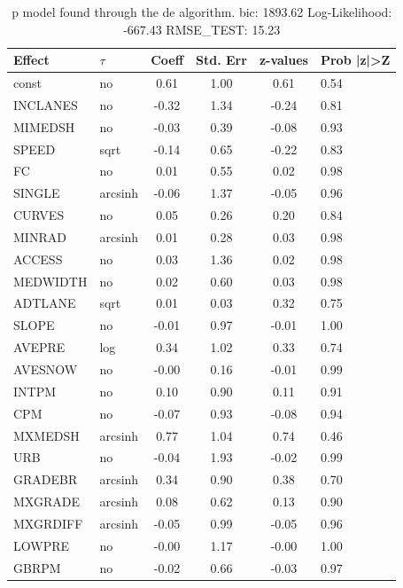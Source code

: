 \begin{table}
	\caption{p model found through the de algorithm. bic: 1893.62 Log-Likelihood: -667.43 RMSE_TEST: 15.23}
	\begin{center}
		\begin{tabular}{|l|l|c|c|c|l|}
			\hline
			Effect & $\tau$ & Coeff & Std. Err & z-values & Prob |z|>Z \\
			\hline
			const & no & 0.61 & 1.00 & 0.61 & 0.54 \\
			\hline
			INCLANES & no & -0.32 & 1.34 & -0.24 & 0.81 \\
			\hline
			MIMEDSH & no & -0.03 & 0.39 & -0.08 & 0.93 \\
			\hline
			SPEED & sqrt & -0.14 & 0.65 & -0.22 & 0.83 \\
			\hline
			FC & no & 0.01 & 0.55 & 0.02 & 0.98 \\
			\hline
			SINGLE & arcsinh & -0.06 & 1.37 & -0.05 & 0.96 \\
			\hline
			CURVES & no & 0.05 & 0.26 & 0.20 & 0.84 \\
			\hline
			MINRAD & arcsinh & 0.01 & 0.28 & 0.03 & 0.98 \\
			\hline
			ACCESS & no & 0.03 & 1.36 & 0.02 & 0.98 \\
			\hline
			MEDWIDTH & no & 0.02 & 0.60 & 0.03 & 0.98 \\
			\hline
			ADTLANE & sqrt & 0.01 & 0.03 & 0.32 & 0.75 \\
			\hline
			SLOPE & no & -0.01 & 0.97 & -0.01 & 1.00 \\
			\hline
			AVEPRE & log & 0.34 & 1.02 & 0.33 & 0.74 \\
			\hline
			AVESNOW & no & -0.00 & 0.16 & -0.01 & 0.99 \\
			\hline
			INTPM & no & 0.10 & 0.90 & 0.11 & 0.91 \\
			\hline
			CPM & no & -0.07 & 0.93 & -0.08 & 0.94 \\
			\hline
			MXMEDSH & arcsinh & 0.77 & 1.04 & 0.74 & 0.46 \\
			\hline
			URB & no & -0.04 & 1.93 & -0.02 & 0.99 \\
			\hline
			GRADEBR & arcsinh & 0.34 & 0.90 & 0.38 & 0.70 \\
			\hline
			MXGRADE & arcsinh & 0.08 & 0.62 & 0.13 & 0.90 \\
			\hline
			MXGRDIFF & arcsinh & -0.05 & 0.99 & -0.05 & 0.96 \\
			\hline
			LOWPRE & no & -0.00 & 1.17 & -0.00 & 1.00 \\
			\hline
			GBRPM & no & -0.02 & 0.66 & -0.03 & 0.97 \\

\end{tabular}
\end{center}
\end{table}
